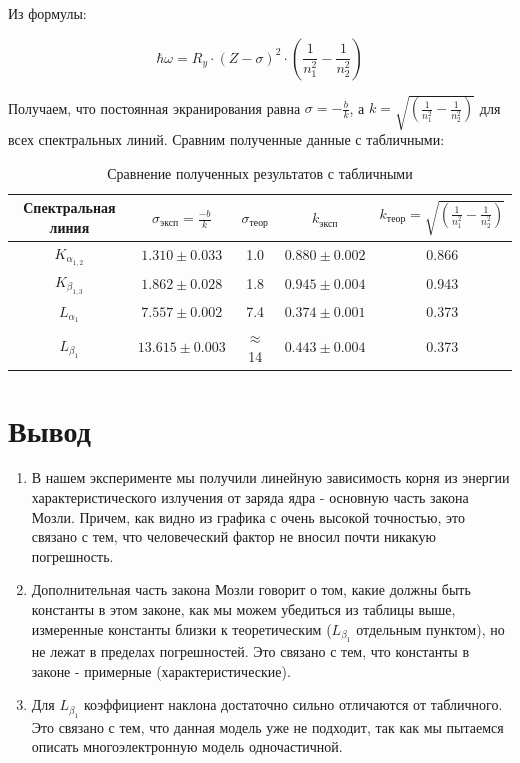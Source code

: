 \documentclass[a4paper, 12pt]{article}%
\begin{document}
		Из формулы:

		\[\hbar \omega = R_y \cdot (Z - \sigma)^2 \cdot \left(\dfrac{1}{n_1^2} - \dfrac{1}{n_2^2}\right)\]

		Получаем,  что постоянная экранирования равна $\sigma = -\frac{b}{k}$, а $k = \sqrt{\left(\frac{1}{n_1^2} - \frac{1}{n_2^2}\right)}$ для всех спектральных линий.  Сравним полученные данные с табличными:

		\begin{table}[!ht]
			\centering
			\begin{tabular}{|c|c|c|c|c|}
				\hline
				Спектральная линия & $\sigma_{\text{эксп}} = \frac{-b}{k}$ & $\sigma_{\text{теор}}$ & $k_{\text{эксп}}$ & $k_{\text{теор}} = \sqrt{\left(\frac{1}{n_1^2} - \frac{1}{n_2^2}\right)}$ \\
				\hline
				$K_{\alpha_{1, 2}}$ & $1.310 \pm 0.033$ & 1.0 & $0.880 \pm 0.002$ & 0.866 \\
				$K_{\beta_{1, 3}}$ & $1.862 \pm 0.028$ & 1.8 & $0.945 \pm 0.004$ & 0.943 \\
				$L_{\alpha_1}$ & $7.557 \pm 0.002$ & 7.4  & $0.374 \pm 0.001$ & 0.373 \\
				$L_{\beta_1}$ & $13.615 \pm 0.003$ & $\approx$ 14 & $0.443 \pm 0.004$ & 0.373 \\
				\hline
			\end{tabular}
			\caption{Сравнение полученных результатов с табличными}
		\end{table}

    \section*{Вывод}
    
    		\begin{enumerate}
    		
			\item В нашем эксперименте мы получили линейную зависимость корня из энергии характеристического излучения от заряда ядра - основную часть закона Мозли.  Причем,  как видно из графика с очень высокой точностью,  это связано с тем, что человеческий фактор не вносил почти никакую погрешность.
			
			\item Дополнительная часть закона Мозли говорит о том,  какие должны быть константы в этом законе,  как мы можем убедиться из таблицы выше,  измеренные константы близки к теоретическим ($L_{\beta_1}$ отдельным пунктом),  но не лежат в пределах погрешностей.  Это связано с тем,  что константы в законе - примерные (характеристические).
			
			\item Для $L_{\beta_1}$ коэффициент наклона достаточно сильно отличаются от табличного.  Это связано с тем,  что данная модель уже не подходит,  так как мы пытаемся описать многоэлектронную модель одночастичной.
    		
    		\end{enumerate}
\end{document}
